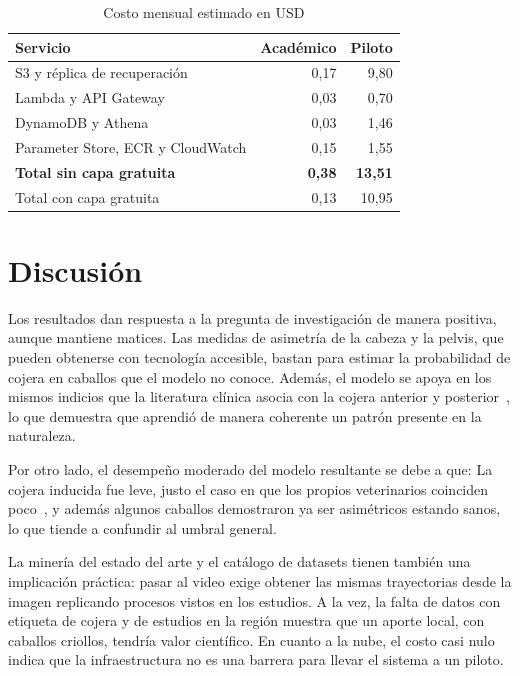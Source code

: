 \documentclass[conference,a4paper]{IEEEtran}
\begin{document}
\begin{table}[!htb]
\centering
\caption{Costo mensual estimado en USD}
\label{tab:costos}
\begin{tabular}{lrr}
\toprule
Servicio & Académico & Piloto \\
\midrule
S3 y réplica de recuperación & 0,17 & 9,80 \\
Lambda y API Gateway & 0,03 & 0,70 \\
DynamoDB y Athena & 0,03 & 1,46 \\
Parameter Store, ECR y CloudWatch & 0,15 & 1,55 \\
\midrule
\textbf{Total sin capa gratuita} & \textbf{0,38} & \textbf{13,51} \\
Total con capa gratuita & 0,13 & 10,95 \\
\bottomrule
\end{tabular}
\end{table}

\section{Discusión}

Los resultados dan respuesta a la pregunta de investigación de manera positiva, aunque mantiene matices. Las medidas de asimetría de la cabeza y la pelvis, que pueden obtenerse con tecnología accesible, bastan para estimar la probabilidad de cojera en caballos que el modelo no conoce. Además, el modelo se apoya en los mismos indicios que la literatura clínica asocia con la cojera anterior y posterior~\cite{keegan2013}, lo que demuestra que aprendió de manera coherente un patrón presente en la naturaleza.

Por otro lado, el desempeño moderado del modelo resultante se debe a que: La cojera inducida fue leve, justo el caso en que los propios veterinarios coinciden poco~\cite{keegan2010,hammarberg2016}, y además algunos caballos demostraron ya ser asimétricos estando sanos, lo que tiende a confundir al umbral general.

La minería del estado del arte y el catálogo de datasets tienen también una implicación práctica: pasar al video exige obtener las mismas trayectorias desde la imagen replicando procesos vistos en los estudios. A la vez, la falta de datos con etiqueta de cojera y de estudios en la región muestra que un aporte local, con caballos criollos, tendría valor científico. En cuanto a la nube, el costo casi nulo indica que la infraestructura no es una barrera para llevar el sistema a un piloto.
\end{document}

